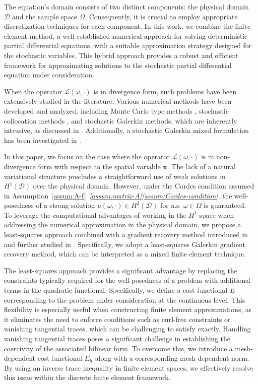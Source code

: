 \documentclass[final,onefignum,onetabnum]{mousaviart}
\begin{document}
	The equation's domain consists of two distinct components: the physical domain $\mathcal{D}$ and the sample space $\Omega$. Consequently, it is crucial to employ appropriate discretization techniques for each component. In this work, we combine the finite element method, a well-established numerical approach for solving deterministic partial differential equations, with a suitable approximation strategy designed for the stochastic variables. This hybrid approach provides a robust and efficient framework for approximating solutions to the stochastic partial differential equation under consideration.
	
	When the operator $\mathcal{L}(\omega, \cdot)$ is in divergence form, such problems have been extensively studied in the literature. Various numerical methods have been developed and analyzed, including Monte Carlo type methods \cite{Grham&etal, Dick&etal1, Dick&etal2}, stochastic collocation methods \cite{Babuska-Nobile-Tempone, Nobile&Tempone&Webster, Xiu-Hesthaven}, and stochastic Galerkin methods, which are inherently intrusive, as discussed in \cite{Babuska-et-al, Frauenfelder-Schwab, Matthies-Keese}. Additionally, a stochastic Galerkin mixed formulation has been investigated in \cite{Ern&Pow&Silv&Ull}.
	
	In this paper, we focus on the case where the operator $\mathcal{L}(\omega, \cdot)$ is in non-divergence form with respect to the spatial variable $\boldsymbol{x}$. The lack of a natural variational structure precludes a straightforward use of weak solutions in $H^1(\mathcal{D})$ over the physical domain. However, under the Cordes condition assumed in Assumption~\ref{assum:A-f}~\textit{\ref{assum:matrix-A}\ref{assum:Cordes-condition}}, the well-posedness of a strong solution $u(\omega, \cdot) \in H^2(\mathcal{D})$ for a.s. $\omega \in \Omega$ is guaranteed. To leverage the computational advantages of working in the $H^1$ space when addressing the numerical approximation in the physical domain, we propose a least-squares approach combined with a gradient recovery method introduced in \cite{Gallistl} and further studied in \cite{Lakkis-Mousavi}. Specifically, we adopt a least-squares Galerkin gradient recovery method, which can be interpreted as a mixed finite element technique.
	
	The least-squares approach provides a significant advantage by replacing the constraints typically required for the well-posedness of a problem with additional terms in the quadratic functional. Specifically, we define a cost functional $E$ corresponding to the problem under consideration at the continuous level. This flexibility is especially useful when constructing finite element approximations, as it eliminates the need to enforce conditions such as curl-free constraints or vanishing tangential traces, which can be challenging to satisfy exactly.
	Handling vanishing tangential traces poses a significant challenge in establishing the coercivity of the associated bilinear form. To overcome this, we introduce a mesh-dependent cost functional $E_h$ along with a corresponding mesh-dependent norm. By using an inverse trace inequality in finite element spaces, we effectively resolve this issue within the discrete finite element framework.
	
\end{document}
